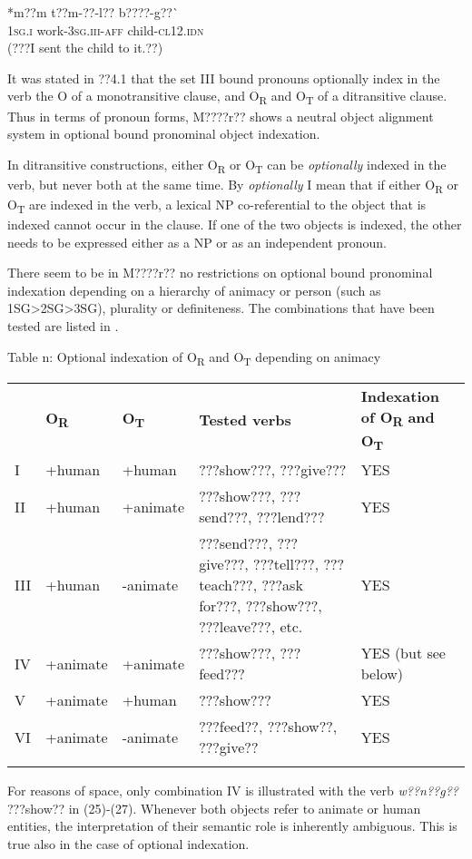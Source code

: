 \documentclass[output=paper]{langsci/langscibook}
\begin{document}
\ea \gll 
\label{bkm:Ref424201839}*m??m  t??m-??-l??      b????-g??\`{ }
\\
%
\textsc{1sg.i  }  work-\textsc{3sg.iii-aff}    child-\textsc{cl12.idn}
\\\glt
(???I sent the child to it.??)
\z

It was stated in ??4.1 that the set III bound pronouns optionally index in the verb the O of a monotransitive clause, and O\textsubscript{R} and O\textsubscript{T }of a ditransitive clause. Thus in terms of pronoun forms, M????r?? shows a neutral object alignment system in optional bound pronominal object indexation.  

In ditransitive constructions, either O\textsubscript{R} or O\textsubscript{T} can be \textit{optionally} indexed in the verb, but never both at the same time. By \textit{optionally} I mean that if either O\textsubscript{R} or O\textsubscript{T} are indexed in the verb, a lexical NP co-referential to the object that is indexed cannot occur in the clause. If one of the two objects is indexed, the other needs to be expressed either as a NP or as an independent pronoun. 

There seem to be in M????r?? no restrictions on optional bound pronominal indexation depending on a hierarchy of animacy or person (such as 1SG{\textgreater}2SG{\textgreater}3SG), plurality or definiteness. The combinations that have been tested are listed in .

\begin{table}\caption{
\label{bkm:Ref444780805}Table n: Optional indexation of O\textsubscript{R} and O\textsubscript{T} depending on animacy
}\end{table}

\begin{tabularx}{\textwidth}{XXXXX} & \textbf{O}\textbf{\textsubscript{R}} & \textbf{O}\textbf{\textsubscript{T}} & \textbf{Tested verbs} & \textbf{Indexation of O}\textbf{\textsubscript{R}}\textbf{ and O}\textbf{\textsubscript{T}}\textbf{ }\\
\lsptoprule
I & +human & +human & ???show???, ???give??? & YES\\
II & +human & +animate & ???show???, ???send???, ???lend??? & YES\\
III & +human & {}-animate & ???send???, ???give???, ???tell???, ???teach???, ???ask for???, ???show???, ???leave???, etc. & YES\\
IV & +animate & +animate & ???show???, ???feed??? & YES (but see below)\\
V & +animate & +human & ???show??? & YES\\
VI & +animate & {}-animate & ???feed??, ???show??, ???give?? & YES\\
\lspbottomrule
\end{tabularx}
For reasons of space, only combination IV is illustrated with the verb \textit{w??n??g??} ???show?? in (25){}-(27). Whenever both objects refer to animate or human entities, the interpretation of their semantic role is inherently ambiguous. This is true also in the case of optional indexation.
\end{document}
